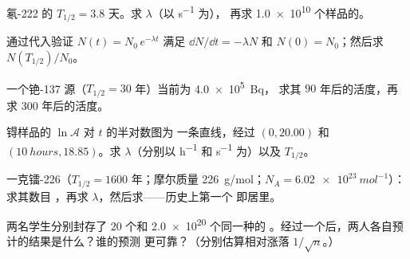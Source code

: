 \begin{exercise}[$\star$]\label{exo:g12:radioactive-decay:2}
氡-222 的 $T_{1/2} = 3.8$ 天。求 $\lambda$（以 \unit{s^{-1}} 为），
再求 \num{1.0e10} 个样品的。
\end{exercise}

\begin{exercise}[$\star$]\label{exo:g12:radioactive-decay:3}
通过代入验证 $N(t) = N_0\,e^{-\lambda t}$ 满足
$\dd N/\dd t = -\lambda N$ 和 $N(0) = N_0$；然后求 $N(T_{1/2})/N_0$。
\end{exercise}

\begin{exercise}[$\star$]\label{exo:g12:radioactive-decay:4}
一个铯-137 源（$T_{1/2} = 30$ 年）当前为 \qty{4.0e5}{Bq}，
求其 $90$ 年后的活度，再求 $300$ 年后的活度。
\end{exercise}

\begin{exercise}[$\star$]\label{exo:g12:radioactive-decay:5}
锝样品的 $\ln \mathcal A$ 对 $t$ 的半对数图为
一条直线，经过 $(0, 20.00)$ 和 $(\qty{10}{hours}, 18.85)$。求
$\lambda$（分别以 \unit{h^{-1}} 和 \unit{s^{-1}} 为）以及 $T_{1/2}$。
\end{exercise}

\begin{exercise}[$\star\star$]\label{exo:g12:radioactive-decay:6}
一克镭-226（$T_{1/2} = 1600$ 年；摩尔质量
\qty{226}{g/mol}；$N_A = \qty{6.02e23}{mol^{-1}}$）：求其数目
，再求 $\lambda$，然后求——历史上第一个
即居里。
\end{exercise}

\begin{exercise}[$\star\star$]\label{exo:g12:radioactive-decay:7}
两名学生分别封存了 $20$ 个和 \num{2.0e20} 个同一种的
。经过一个后，两人各自预计的结果是什么？谁的预测
更可靠？（分别估算相对涨落 $1/\sqrt n$。）
\end{exercise}

